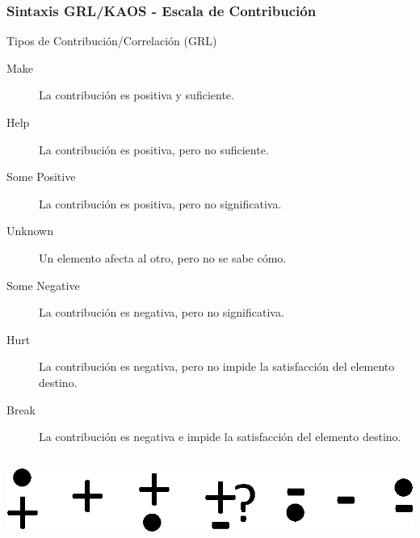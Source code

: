 \documentclass[handout,slidestop,xcolor=pst,dvips,blue]{beamer}
\begin{document}
\begin{frame}[c]
    \frametitle{Sintaxis GRL/KAOS - Escala de Contribución}
    \begin{block}{Tipos de Contribución/Correlación (GRL)}
        \begin{description}
            \item[Make] La contribución es positiva y suficiente.
            \item[Help] La contribución es positiva, pero no suficiente.
            \item[Some Positive] La contribución es positiva, pero no significativa.
            \item[Unknown] Un elemento afecta al otro, pero no se sabe cómo.
            \item[Some Negative] La contribución es negativa, pero no significativa.
            \item[Hurt] La contribución es negativa, pero no impide la satisfacción del elemento destino.
            \item[Break] La contribución es negativa e impide la satisfacción del elemento destino.
        \end{description}
        \begin{columns}[c]
            \begin{column}{\linewidth}
                \centering \includegraphics[width=0.70\columnwidth,keepaspectratio=true]{images/objetivos/influence(GRL).eps}
            \end{column}
        \end{columns}
    \end{block}
\end{frame}
\end{document}
